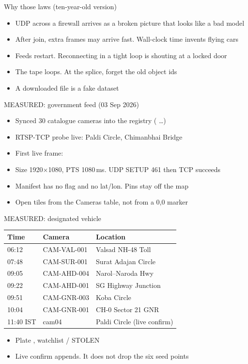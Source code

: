 \documentclass[aspectratio=169,11pt]{beamer}
\begin{document}
\begin{frame}{Why those laws (ten-year-old version)}
\begin{itemize}\itemsep0.55em
\item UDP across a firewall arrives as a broken picture that looks like a bad model
\item After join, extra frames may arrive fast. Wall-clock time invents flying cars
\item Feeds restart. Reconnecting in a tight loop is shouting at a locked door
\item The tape loops. At the splice, forget the old object ids
\item A downloaded  file is a fake dataset
\end{itemize}
\end{frame}

\begin{frame}{MEASURED: government feed (03 Sep 2026)}
\begin{itemize}\itemsep0.5em
\item Synced 30 catalogue cameras into the registry ( \ldots {})
\item RTSP-TCP probe live:  Paldi Circle,  Chimanbhai Bridge
\item First live frame: 
\item Size 1920$\times$1080, PTS 1080\,ms. UDP SETUP 461 then TCP succeeds
\item Manifest has no  flag and no lat/lon. Pins stay off the map
\item Open tiles from the Cameras table, not from a 0,0 marker
\end{itemize}
\end{frame}

\begin{frame}{MEASURED: designated vehicle}
\begin{center}
\begin{tabular}{@{}lll@{}}
\toprule
Time & Camera & Location \\
\midrule
06:12 & CAM-VAL-001 & Valsad NH-48 Toll \\
07:48 & CAM-SUR-001 & Surat Adajan Circle \\
09:05 & CAM-AHD-004 & Narol--Naroda Hwy \\
09:22 & CAM-AHD-001 & SG Highway Junction \\
09:51 & CAM-GNR-003 & Koba Circle \\
10:04 & CAM-GNR-001 & CH-0 Sector 21 GNR \\
11:40 IST & cam04 & Paldi Circle (live confirm) \\
\bottomrule
\end{tabular}
\end{center}
\medskip
\begin{itemize}\itemsep0.45em
\item Plate , watchlist  / STOLEN
\item Live confirm appends. It does not drop the six seed points
\end{itemize}
\end{frame}
\end{document}
